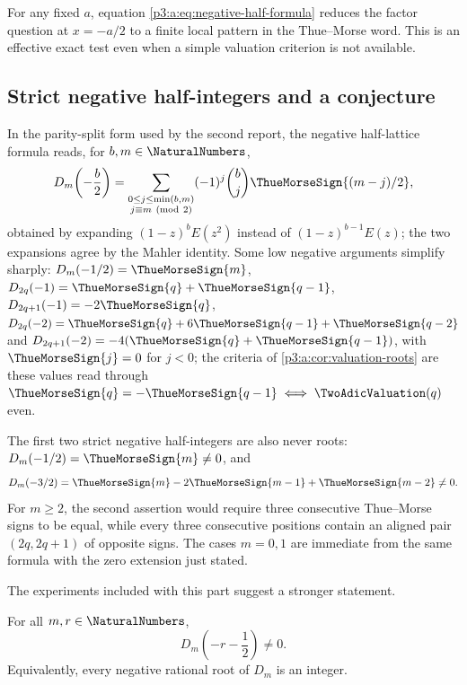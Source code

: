 \documentclass[11pt,oneside]{article}
\numberwithin{equation}{section}
\theoremstyle{definition}
\theoremstyle{remark}
\begin{document}
For any fixed \(a\), equation \eqref{p3:a:eq:negative-half-formula} reduces the
factor question at \(x=-a/2\) to a finite local pattern in the Thue--Morse
word.  This is an effective exact test even when a simple valuation criterion
is not available.

\subsection{Strict negative half-integers and a conjecture}
In the parity-split form used by the second report, the negative
half-lattice formula reads, for $b,m\in\NaturalNumbers$,
\begin{equation}\label{p3:b:eq:negative-half-value}
 D_m\!\left(-\frac b2\right)
 =\sum_{\substack{0\le j\le\min(b,m)\\j\equiv m\ (\mathrm{mod}\ 2)}}
   (-1)^j\binom bj\ThueMorseSign{(m-j)/2},
\end{equation}
obtained by expanding $(1-z)^bE(z^2)$ instead of $(1-z)^{b-1}E(z)$; the two
expansions agree by the Mahler identity. Some low negative arguments
simplify sharply: $D_m(-1/2)=\ThueMorseSign{m}$, $D_{2q}(-1)=\ThueMorseSign{q}+\ThueMorseSign{q-1}$,
$D_{2q+1}(-1)=-2\ThueMorseSign{q}$, $D_{2q}(-2)=\ThueMorseSign{q}+6\ThueMorseSign{q-1}+\ThueMorseSign{q-2}$ and
$D_{2q+1}(-2)=-4(\ThueMorseSign{q}+\ThueMorseSign{q-1})$, with $\ThueMorseSign{j}=0$ for $j<0$; the
criteria of \cref{p3:a:cor:valuation-roots} are these values read through
$\ThueMorseSign{q}=-\ThueMorseSign{q-1}\iff\TwoAdicValuation(q)$ even.

The first two strict negative half-integers are also never roots:
$D_m(-1/2)=\ThueMorseSign{m}\ne0$, and
\[
 D_m(-3/2)=\ThueMorseSign{m}-2\ThueMorseSign{m-1}+\ThueMorseSign{m-2}\ne0.
\]
For $m\ge2$, the second assertion would require three consecutive
Thue--Morse signs to be equal, while every three consecutive positions
contain an aligned pair $(2q,2q+1)$ of opposite signs.  The cases $m=0,1$
are immediate from the same formula with the zero extension just stated.

The experiments included with this part suggest a stronger statement.

\begin{conjecture}
\label{p3:b:conj:no-negative-strict-half}
For all $m,r\in\NaturalNumbers$,
\begin{equation}
 D_m\!\left(-r-\frac12\right)\ne0.
 \label{p3:b:eq:no-negative-strict-half}
\end{equation}
Equivalently, every negative rational root of $D_m$ is an integer.
\end{conjecture}
\end{document}
